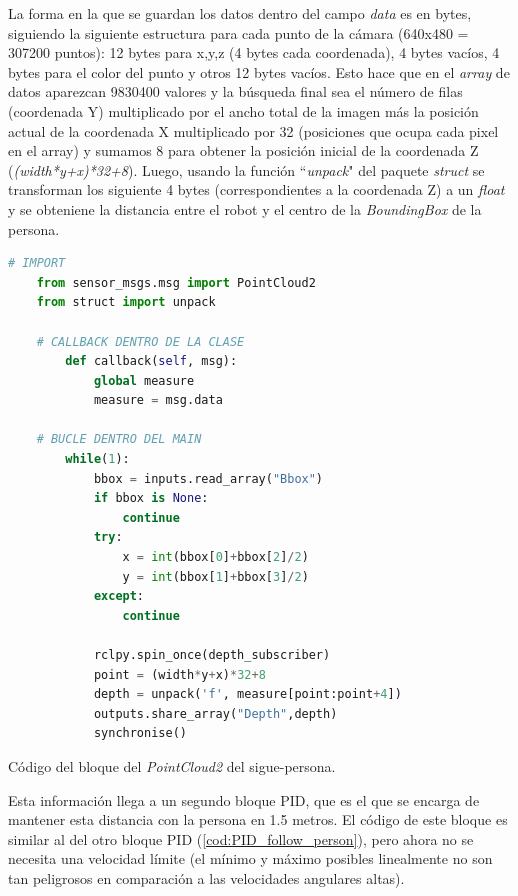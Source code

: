 La forma en la que se guardan los datos dentro del campo \textit{data} es en bytes, siguiendo la siguiente estructura para cada punto de la cámara (640x480 = 307200 puntos):
12 bytes para x,y,z (4 bytes cada coordenada), 4 bytes vacíos, 4 bytes para el color del punto y otros 12 bytes vacíos. Esto hace que en el \textit{array} de datos
aparezcan 9830400 valores y la búsqueda final sea el número de filas (coordenada Y) multiplicado por el ancho total de la imagen más la posición actual de la coordenada X
multiplicado por 32 (posiciones que ocupa cada pixel en el array) y sumamos 8 para obtener la posición inicial de la coordenada Z (\textit{(width*y+x)*32+8}). Luego, usando la función
``\textit{unpack}" del paquete \textit{struct} se transforman los siguiente 4 bytes (correspondientes a la coordenada Z) a un \textit{float} y se obteniene
la distancia entre el robot y el centro de la \textit{BoundingBox} de la persona.

\begin{code}[H]
    \begin{lstlisting}[language=python]
    # IMPORT
    from sensor_msgs.msg import PointCloud2
    from struct import unpack

    # CALLBACK DENTRO DE LA CLASE
        def callback(self, msg):
            global measure
            measure = msg.data

    # BUCLE DENTRO DEL MAIN
        while(1):
            bbox = inputs.read_array("Bbox")
            if bbox is None:
                continue
            try:
                x = int(bbox[0]+bbox[2]/2)
                y = int(bbox[1]+bbox[3]/2)
            except:
                continue

            rclpy.spin_once(depth_subscriber)
            point = (width*y+x)*32+8
            depth = unpack('f', measure[point:point+4])
            outputs.share_array("Depth",depth)   
            synchronise()
    \end{lstlisting}
    \caption[Código bloque Camera-Depth sigue-persona]{Código del bloque del \textit{PointCloud2} del sigue-persona.}
    \label{cod:PC2_block_FP}
\end{code}

Esta información llega a un segundo bloque PID, que es el que se encarga de mantener esta distancia con la persona en 1.5 metros. El código de este bloque
es similar al del otro bloque PID (\ref{cod:PID_follow_person}), pero ahora no se necesita una velocidad límite (el mínimo y máximo posibles linealmente
no son tan peligrosos en comparación a las velocidades angulares altas).

